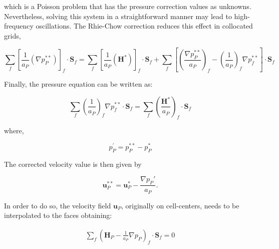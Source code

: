 \documentclass[final,3p,times,10pt,onecolumn]{myElsarticle}
\numberwithin{equation}{section}
\begin{document}


\noindent which is a Poisson problem that has the pressure correction values as unknowns. Nevertheless, solving this system in a straightforward manner may lead to high-frequency oscillations. The Rhie-Chow correction \cite{rhiechow} reduces this effect in collocated grids, 

\begin{equation}
\label{eq:pEqnSIMPLE2}
\sum_f 
\left[
\frac{1}{a_P}
\left(
\nabla p_P^{**}
\right)
\right]_f\cdot \boldsymbol{S}_f 
=
\sum_f 
\left[
\frac{1}{a_P}
\left(
\boldsymbol{H}^*
\right)
\right]_f
\cdot
\boldsymbol{S}_f 
+
\sum_f  
\left[
\left(
\frac{\nabla p_P^{**}}{a_P}
\right)_f
- 
\left(
\frac{1}{a_P}
\right)_f 
\nabla p_f^{**} 
\right]
\cdot 
\boldsymbol{S}_f 
\end{equation}

 Finally, the pressure equation can be written as:



\begin{equation}\label{eq:pEqnSIMPLE3}
\sum_f \left(\frac{1}{a_P}\right)_f \nabla p_f^{**} \cdot \boldsymbol{S}_f =  \sum_f \left(\frac{\boldsymbol{H}^*}{a_P}\right)_f \cdot \boldsymbol{S}_f 
\end{equation}

\noindent where,

\begin{equation}
 p_P^{'} = p_P^{**} - p_P^{*}
\end{equation}

The corrected velocity value is then given by

\begin{equation}\label{eq:SIMPLECorr}
\boldsymbol{u}_P^{**} = \boldsymbol{u}_P^* - \frac{\nabla p_P'}{a_P}.
\end{equation}

\iffalse
 In order to do so, the velocity field $\boldsymbol{u}_P$, originally on cell-centers, needs to be interpolated to the faces obtaining: 

 \begin{equation}
 \begin{split}
 \sum_{f} \left( \boldsymbol{H}_P - \frac{1}{a_P} \nabla p_P  \right)_f \cdotp \textbf{S}_{f} = 0 
 \end{split}
 \label{eq:pEq1} 
 \end{equation}
\end{document}

